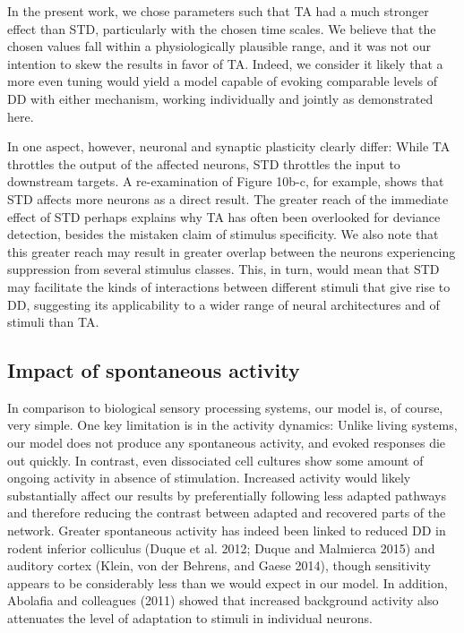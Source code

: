\documentclass[pdflatex,referee,iicol,sn-basic]{sn-jnl}
\begin{document}
In the present work, we chose parameters such that TA had a much stronger effect than STD, particularly with the chosen time scales. We believe that the chosen values fall within a physiologically plausible range, and it was not our intention to skew the results in favor of TA. Indeed, we consider it likely that a more even tuning would yield a model capable of evoking comparable levels of DD with either mechanism, working individually and jointly as demonstrated here.

In one aspect, however, neuronal and synaptic plasticity clearly differ: While TA throttles the output of the affected neurons, STD throttles the input to downstream targets. A re-examination of Figure 10b-c, for example, shows that STD affects more neurons as a direct result. The greater reach of the immediate effect of STD perhaps explains why TA has often been overlooked for deviance detection, besides the mistaken claim of stimulus specificity. We also note that this greater reach may result in greater overlap between the neurons experiencing suppression from several stimulus classes. This, in turn, would mean that STD may facilitate the kinds of interactions between different stimuli that give rise to DD, suggesting its applicability to a wider range of neural architectures and of stimuli than TA.

\subsection{Impact of spontaneous activity}

In comparison to biological sensory processing systems, our model is, of course, very simple. One key limitation is in the activity dynamics: Unlike living systems, our model does not produce any spontaneous activity, and evoked responses die out quickly. In contrast, even dissociated cell cultures show some amount of ongoing activity in absence of stimulation. Increased activity would likely substantially affect our results by preferentially following less adapted pathways and therefore reducing the contrast between adapted and recovered parts of the network. Greater spontaneous activity has indeed been linked to reduced DD in rodent inferior colliculus (Duque et al. 2012; Duque and Malmierca 2015) and auditory cortex (Klein, von der Behrens, and Gaese 2014), though sensitivity appears to be considerably less than we would expect in our model. In addition, Abolafia and colleagues (2011) showed that increased background activity also attenuates the level of adaptation to stimuli in individual neurons.
\end{document}
